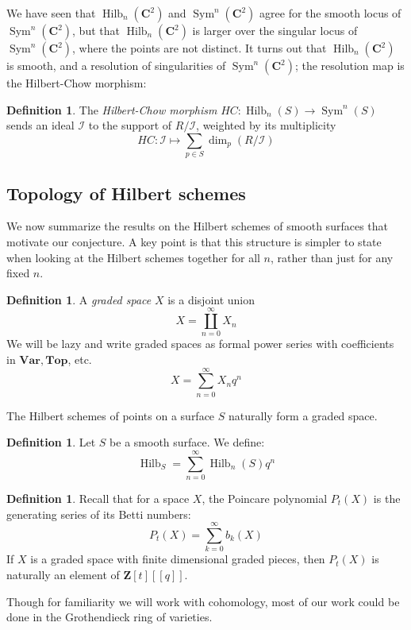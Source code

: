 \documentclass{amsart}[12pt]
\theoremstyle{definition}
\newtheorem{definition}[dummy]{Definition}
\newcommand{\Z}{\mathbf{Z}}
\newcommand{\C}{\mathbf{C}}
\newcommand{\II}{\mathcal{I}}
\newcommand{\Var}{\mathbf{Var}}
\newcommand{\Top}{\mathbf{Top}}
\DeclareMathOperator{\Hilb}{Hilb}
\DeclareMathOperator{\Sym}{Sym}
\newcommand{\HG}{\Hilb}
\begin{document}
We have seen that $\Hilb_n(\C^2)$ and $\Sym^n(\C^2)$ agree for the smooth locus of $\Sym^n(\C^2)$, but that $\Hilb_n(\C^2)$ is larger over the singular locus of $\Sym^n(\C^2)$, where the points are not distinct.  It turns out that $\Hilb_n(\C^2)$ is smooth, and a resolution of singularities of $\Sym^n(\C^2)$; the resolution map is the Hilbert-Chow morphism:

\begin{definition}
The \emph{Hilbert-Chow morphism} $HC:\Hilb_n(S)\to\Sym^n(S)$ sends an ideal $\II$ to the support of $R/\II$, weighted by its multiplicity
$$HC:\II\mapsto \sum_{p\in S} \dim_p (R/\II)$$
\end{definition}









\subsection{Topology of Hilbert schemes}


We now summarize the results on the Hilbert schemes of smooth surfaces that motivate our conjecture.  A key point is that this structure is simpler to state when looking at the Hilbert schemes together for all $n$, rather than just for any fixed $n$.  

\begin{definition}
A \emph{graded space} $X$ is a disjoint union $$X=\coprod_{n=0}^\infty X_n$$
We will be lazy and write graded spaces as formal power series with coefficients in $\Var, \Top$, etc.
$$X=\sum_{n=0}^\infty X_nq^n$$
\end{definition}

The Hilbert schemes of points on a surface $S$ naturally form a graded space.

\begin{definition}
Let $S$ be a smooth surface.  We define:
$$\HG_S=\sum_{n=0}^\infty \Hilb_n(S)q^n$$
\end{definition}

\begin{definition}
Recall that for a space $X$, the Poincare polynomial $P_t(X)$ is the generating series of its Betti numbers:
$$P_t(X)=\sum_{k=0}^\infty b_k(X)$$
If $X$ is a graded space with finite dimensional graded pieces, then $P_t(X)$ is naturally an element of $\Z[t][[q]]$.
\end{definition}
 
Though for familiarity we will work with cohomology, most of our work could be done in the Grothendieck ring of varieties.
\end{document}
